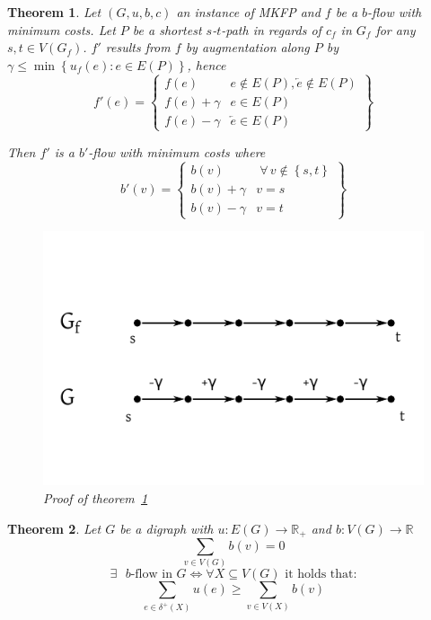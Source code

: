 \documentclass{article}
\newtheorem{theorem}{Theorem}
\newcommand{\set}[1]{\left\{#1\right\}}
\newcommand{\gath}[2]{$#1$-$#2$-path} %
\newcommand{\fall}{\;\forall\,}
\begin{document}
\begin{theorem}\label{satz-5.8}
  Let $(G, u, b, c)$ an instance of MKFP and $f$ be a $b$-flow with minimum costs.
  Let $P$ be a shortest \gath st in regards of $c_f$ in $G_f$ for any $s, t \in V(G_f)$.
  $f'$ results from $f$ by augmentation along $P$ by $\gamma \leq \min\set{u_f(e): e \in E(P)}$,
  hence
  \[
    f'(e) = \left\{\begin{array}{lc}
      f(e) & e \notin E(P), \overleftarrow{e} \notin E(P) \\
      f(e) + \gamma & e \in E(P) \\
      f(e) - \gamma & \overleftarrow{e} \in E(P)
    \end{array}\right\}
  \]

  Then $f'$ is a $b'$-flow with minimum costs where
  \[
    b'(v) = \left\{\begin{array}{lc}
      b(v) & \fall v \notin \set{s,t} \\
      b(v) + \gamma & v = s \\
      b(v) - \gamma & v = t
    \end{array}\right\}
  \]

  \begin{figure}[ht]
   \begin{center}
    \includegraphics{img/satz_5_8.pdf}
    \caption{Proof of theorem~\ref{satz-5.8}}
   \end{center}
  \end{figure}
\end{theorem}
\begin{theorem}\label{lemma-5.10}
  Let $G$ be a digraph with $u: E(G) \rightarrow \mathbb{R}_+$ and $b: V(G) \rightarrow \mathbb{R}$
  \[ \sum_{v \in V(G)} b(v) = 0 \]
  \begin{equation*}
    \exists \text{ $b$-flow in } G \Leftrightarrow \forall X \subseteq V(G) \text{ it holds that:}
  \end{equation*} \begin{equation*}
    \sum_{e \in \delta^+(X)} u(e) \geq \sum_{v \in V(X)} b(v)
  \end{equation*}
\end{theorem}
\end{document}
